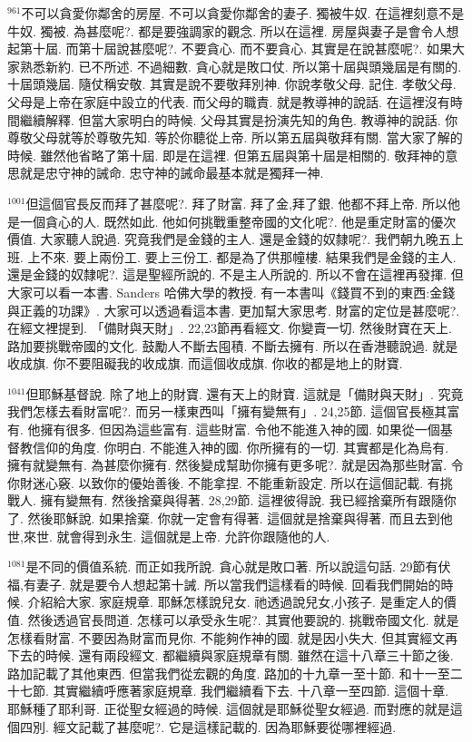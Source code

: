 \documentclass{book}
\begin{document}
$^{961}$不可以貪愛你鄰舍的房屋.
不可以貪愛你鄰舍的妻子.
獨被牛奴.
在這裡刻意不是牛奴.
獨被.
為甚麼呢?.
都是要強調家的觀念.
所以在這裡.
房屋與妻子是會令人想起第十屆.
而第十屆說甚麼呢?.
不要貪心.
而不要貪心.
其實是在說甚麼呢?.
如果大家熟悉新約.
已不所述.
不過細數.
貪心就是敗口仗.
所以第十屆與頭幾屆是有關的.
十屆頭幾屆.
隨仗稱安敬.
其實是說不要敬拜別神.
你說孝敬父母.
記住.
孝敬父母.
父母是上帝在家庭中設立的代表.
而父母的職責.
就是教導神的說話.
在這裡沒有時間繼續解釋.
但當大家明白的時候.
父母其實是扮演先知的角色.
教導神的說話.
你尊敬父母就等於尊敬先知.
等於你聽從上帝.
所以第五屆與敬拜有關.
當大家了解的時候.
雖然他省略了第十屆.
即是在這裡.
但第五屆與第十屆是相關的.
敬拜神的意思就是忠守神的誡命.
忠守神的誡命最基本就是獨拜一神.

$^{1001}$但這個官長反而拜了甚麼呢?.
拜了財富.
拜了金,拜了銀.
他都不拜上帝.
所以他是一個貪心的人.
既然如此.
他如何挑戰重整帝國的文化呢?.
他是重定財富的優次價值.
大家聽人說過.
究竟我們是金錢的主人.
還是金錢的奴隸呢?.
我們朝九晚五上班.
上不來.
要上兩份工.
要上三份工.
都是為了供那幢樓.
結果我們是金錢的主人.
還是金錢的奴隸呢?.
這是聖經所說的.
不是主人所說的.
所以不會在這裡再發揮.
但大家可以看一本書.
Sanders 哈佛大學的教授.
有一本書叫《錢買不到的東西:金錢與正義的功課》.
大家可以透過看這本書.
更加幫大家思考.
財富的定位是甚麼呢?.
在經文裡提到.
「備財與天財」.
22,23節再看經文.
你變賣一切.
然後財寶在天上.
路加要挑戰帝國的文化.
鼓勵人不斷去囤積.
不斷去擁有.
所以在香港聽說過.
就是收成旗.
你不要阻礙我的收成旗.
而這個收成旗.
你收的都是地上的財寶.

$^{1041}$但耶穌基督說.
除了地上的財寶.
還有天上的財寶.
這就是「備財與天財」.
究竟我們怎樣去看財富呢?.
而另一樣東西叫「擁有變無有」.
24,25節.
這個官長極其富有.
他擁有很多.
但因為這些富有.
這些財富.
令他不能進入神的國.
如果從一個基督教信仰的角度.
你明白.
不能進入神的國.
你所擁有的一切.
其實都是化為烏有.
擁有就變無有.
為甚麼你擁有.
然後變成幫助你擁有更多呢?.
就是因為那些財富.
令你財迷心竅.
以致你的優始善後.
不能拿捏.
不能重新設定.
所以在這個記載.
有挑戰人.
擁有變無有.
然後捨棄與得著.
28,29節.
這裡彼得說.
我已經捨棄所有跟隨你了.
然後耶穌說.
如果捨棄.
你就一定會有得著.
這個就是捨棄與得著.
而且去到他世,來世.
就會得到永生.
這個就是上帝.
允許你跟隨他的人.

$^{1081}$是不同的價值系統.
而正如我所說.
貪心就是敗口著.
所以說這句話.
29節有伏福,有妻子.
就是要令人想起第十誡.
所以當我們這樣看的時候.
回看我們開始的時候.
介紹給大家.
家庭規章.
耶穌怎樣說兒女.
祂透過說兒女,小孩子.
是重定人的價值.
然後透過官長問道.
怎樣可以承受永生呢?.
其實他要說的.
挑戰帝國文化.
就是怎樣看財富.
不要因為財富而見你.
不能夠作神的國.
就是因小失大.
但其實經文再下去的時候.
還有兩段經文.
都繼續與家庭規章有關.
雖然在這十八章三十節之後.
路加記載了其他東西.
但當我們從宏觀的角度.
路加的十九章一至十節.
和十一至二十七節.
其實繼續呼應著家庭規章.
我們繼續看下去.
十八章一至四節.
這個十章.
耶穌種了耶利哥.
正從聖女經過的時候.
這個就是耶穌從聖女經過.
而對應的就是這個四別.
經文記載了甚麼呢?.
它是這樣記載的.
因為耶穌要從哪裡經過.
\end{document}
